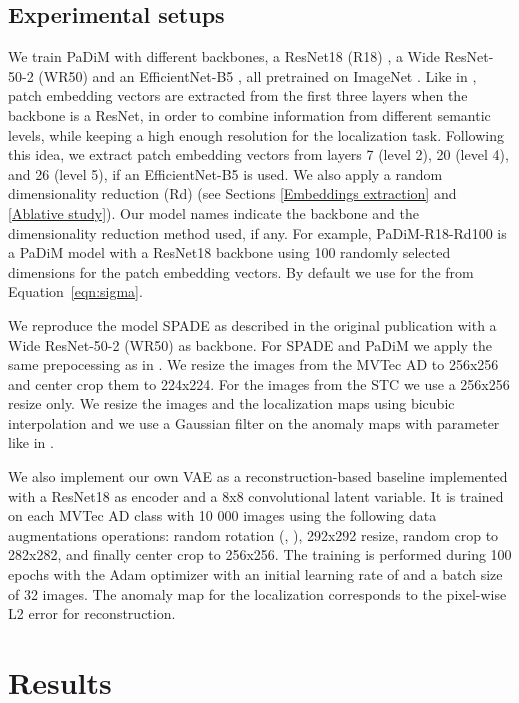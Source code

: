 \documentclass[a4paper,conference]{IEEEtran}
\begin{document}
\subsection{Experimental setups}
\label{experimental setup}
We train PaDiM with different backbones, a ResNet18 (R18) \cite{he2015deep}, a Wide ResNet-50-2 (WR50) \cite{wdr50} and an EfficientNet-B5 \cite{efficientnet}, all pretrained on ImageNet \cite{imagenet_cvpr09}. Like in \cite{cohen2020subimage}, patch embedding vectors are extracted from the first three layers when the backbone is a ResNet, in order to combine information from different semantic levels, while keeping a high enough resolution for the localization task. Following this idea, we extract patch embedding vectors from layers 7 (level 2), 20 (level 4), and 26 (level 5), if an EfficientNet-B5 is used. We also apply a random dimensionality reduction (Rd) (see Sections \ref{Embeddings extraction} and \ref{Ablative study}). Our model names indicate the backbone and the dimensionality reduction method used, if any. For example, PaDiM-R18-Rd100 is a PaDiM model  with a ResNet18 backbone using 100 randomly selected dimensions for the patch embedding vectors. By default we use  for  the  from Equation~\ref{eqn:sigma}.


We reproduce  the model SPADE \cite{cohen2020subimage} as described in the original publication with a Wide ResNet-50-2 (WR50) \cite{wdr50} as backbone.  For SPADE and PaDiM we apply the same prepocessing as in \cite{cohen2020subimage}. We resize the images from the MVTec AD to 256x256 and center crop them to 224x224. For the images from the STC we use a 256x256 resize only. We resize the images and the localization maps using bicubic interpolation and we use a Gaussian filter on the anomaly maps with parameter  like in \cite{cohen2020subimage}.


We also implement our own VAE as a reconstruction-based baseline implemented with a ResNet18 as encoder and  a 8x8 convolutional latent variable. It is trained on each MVTec AD class with 10 000 images using the following data augmentations operations:  random rotation (, ), 292x292 resize, random crop to 282x282, and finally center crop to 256x256. The training is performed during 100 epochs with the Adam optimizer \cite{kingma2013autoencoding} with an initial learning rate of  and a batch size of 32 images. The anomaly map for the localization corresponds to the pixel-wise L2 error for reconstruction.




\section{Results}
\end{document}
